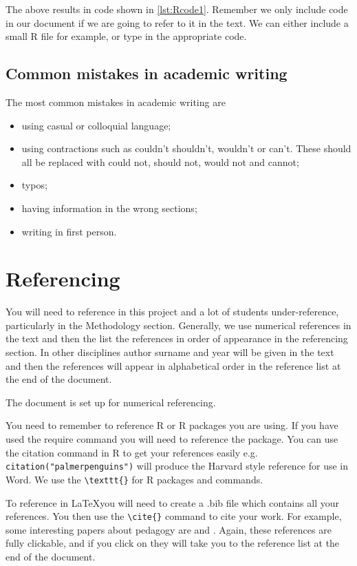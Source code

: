 \documentclass[11pt]{article}
\begin{document}
    The above results in code shown in \autoref{lst:Rcode1}. Remember we only include code in our document if we are going to refer to it in the text. We can either include a small R file for example, or type in the appropriate code.

    

%

    \subsection{Common mistakes in academic writing}

    The most common mistakes in academic writing are
    \begin{itemize}
        \item    using casual or colloquial language;
        \item    using contractions such as couldn’t shouldn’t, wouldn’t or can’t. These should all be replaced with could not, should not, would not and cannot;
        \item    typos;
        \item    having information in the wrong sections;
        \item    writing in first person.
    \end{itemize}


    \section{Referencing}

    You will need to reference in this project and a lot of students under-reference, particularly in the Methodology section. Generally, we use numerical references in the text and then the list the references in order of appearance in the referencing section. In other disciplines author surname and year will be given in the text and then the references will appear in alphabetical order in the reference list at the end of the document.

    The document is set up for numerical referencing.

    You need to remember to reference R or R packages you are using. If you have used the require command you will need to reference the package. You can use the citation command in R to get your references easily e.g. \texttt{citation("palmerpenguins")} will produce the Harvard style reference for use in Word. We use the \verb!\texttt{}! for R packages and commands.

    To reference in \LaTeX you will need to create a .bib file which contains all your references. You then use the \verb!\cite{}! command to cite your work. For example, some interesting papers about pedagogy are \cite{pritchard2010learning} and \cite{harris2015mathematics}. Again, these references are fully clickable, and if you click on they will take you to the reference list at the end of the document.

    \newpage
    \clearpage

    
    \renewcommand{\bibname}{References}
    
\end{document}
